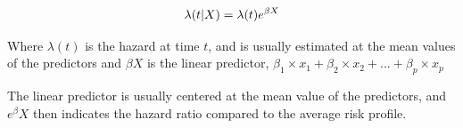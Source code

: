  \begin{equation}
  {\cal \lambda}(t|X) = {\cal \lambda}(t)e^{\beta X}
\label{eq:hazardFuntion}
\end{equation}

Where \( \lambda(t) \) is the hazard at time \(t\), and is usually estimated at the mean values of the predictors and \( \beta X\) is the linear predictor, 
\( \beta_1 \times x_1 + \beta_2 \times x_2 + ... + \beta_p \times x_p\)

 The linear predictor is usually centered at the mean value of the predictors, and \( e^\beta X \) then indicates the hazard
 ratio compared to the average risk profile.

\cleardoublepage